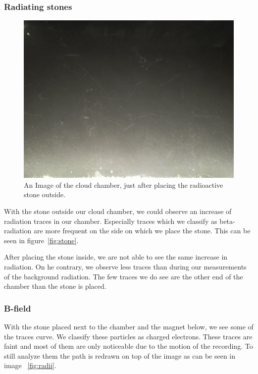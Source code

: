 \documentclass[10pt,a4paper]{article}
\begin{document}
\subsubsection{Radiating stones}
\begin{figure}
    \vspace{-\baselineskip}
    \includegraphics[width=1\linewidth]{images/stoneoutside.jpg}
    \caption{An Image of the cloud chamber, just after placing the radioactive stone outside.}
    \label{fig:stone}
\end{figure}

With the stone outside our cloud chamber, we could observe an increase of radiation traces in our chamber. Especially traces which we classify as beta-radiation are more frequent on the side on which we place the stone. This can be seen in figure~\vref{fig:stone}.

After placing the stone inside, we are not able to see the same increase in radiation. On he contrary, we observe less traces than during our measurements of the background radiation. The few traces we do see are the other end of the chamber than the stone is placed.

\vspace{3\baselineskip}

\subsubsection{B-field}
With the stone placed next to the chamber and the magnet below, we see some of the traces curve. We classify these particles as charged electrons. These traces are faint and most of them are only noticeable due to the motion of the recording. To still analyze them the path is redrawn on top of the image as can be seen in image ~\vref{fig:radii}. 
\end{document}
